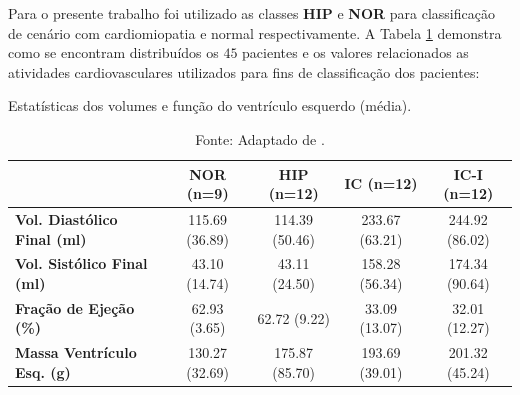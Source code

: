 \noindent Para o presente trabalho foi utilizado as classes \textbf{HIP} e \textbf{NOR} para classificação de cenário com cardiomiopatia e normal respectivamente. A Tabela \ref{tab:sunny_stats} demonstra como se encontram distribuídos os $45$ pacientes e os valores relacionados as atividades cardiovasculares utilizados para fins de classificação dos pacientes:
\newline

\begin{table}[h!]
\centering
\caption{Estatísticas dos volumes e função do ventrículo esquerdo (média).}
\begin{tabular}{@{}lcccc@{}}
\toprule
\textbf{}  & \textbf{NOR (n=9)} & \textbf{HIP (n=12)} & \textbf{IC (n=12)} & \textbf{IC-I (n=12)} \\ \midrule
\textbf{Vol. Diastólico Final (ml)} & 115.69 (36.89)   & 114.39 (50.46)      & 233.67 (63.21)     & 244.92 (86.02)       \\
\textbf{Vol. Sistólico Final (ml)}  & 43.10 (14.74)    & 43.11 (24.50)       & 158.28 (56.34)     & 174.34 (90.64)       \\
\textbf{Fração de Ejeção (\%)}        & 62.93 (3.65)     & 62.72 (9.22)        & 33.09 (13.07)      & 32.01 (12.27)        \\
\textbf{Massa Ventrículo Esq. (g)} & 130.27 (32.69)   & 175.87 (85.70)      & 193.69 (39.01)     & 201.32 (45.24)       \\ \bottomrule
\end{tabular}
\caption*{Fonte: Adaptado de \cite{radauEvaluationFrameworkAlgorithms2009}.}
\label{tab:sunny_stats}
\end{table}




